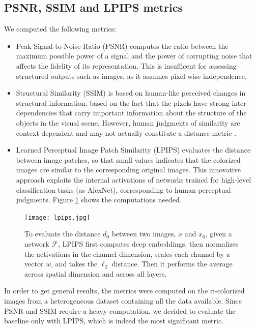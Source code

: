 \subsection{PSNR, SSIM and LPIPS metrics}

We computed the following metrics:
\begin{itemize}
	\item Peak Signal-to-Noise Ratio (PSNR) \cite{psnr-ssim} computes the ratio between the maximum possible power of a signal and the power of corrupting noise that affects the fidelity of its representation. This is insufficent for assessing structured outputs such as images, as it assumes pixel-wise independence.
	
	\item Structural Similarity (SSIM) \cite{psnr-ssim} is based on human-like perceived changes in structural information, based on the fact that the pixels have strong inter-dependencies that carry important information about the structure of the objects in the visual scene. However, human judgments of similarity are context-dependent and may not actually constitute a distance metric \cite{met}.

	\item Learned Perceptual Image Patch Similarity (LPIPS) \cite{lpips} evaluates the distance between image patches, so that small values indicates that the colorized images are similar to the corresponding original images. This innovative approach exploits the internal activations of networks trained for high-level classification tasks (as AlexNet), corresponding to human perceptual judgments. Figure \ref{fig:lp} shows the computations needed.

\end{itemize}

\begin{figure}[h]
	\centering
	\texttt{[image: lpips.jpg]}
	\caption{To evaluate the distance $d_0$ between two images, $x$ and $x_0$, given a network
		$\mathcal{F}$, LPIPS first computes deep embeddings, then normalizes the activations in the channel dimension, scales each channel by a vector $w$, and takes the $\ell_2$ distance. Then it performs the average across spatial dimension and across all layers.}
	\label{fig:lp}
\end{figure}

In order to get general results, the metrics were computed on the ri-colorized images from a heterogeneous dataset containing all the data available. Since PSNR and SSIM require a heavy computation, we decided to evaluate the baseline only with LPIPS, which is indeed the most significant metric.

